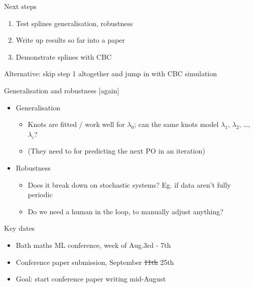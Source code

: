 \documentclass[presentation]{beamer}
\begin{document}
\begin{frame}[label={sec:org85e20cf}]{Next steps}
\begin{enumerate}
\item Test splines generalisation, robustness
\item Write up results so far into a paper
\item Demonstrate splines with CBC
\end{enumerate}

\vfill
Alternative: skip step 1 altogether and jump in with CBC simulation
\end{frame}

\begin{frame}[label={sec:org1e950a4}]{Generalisation and robustness [again]}
\begin{itemize}
\item Generalisation
\begin{itemize}
\item Knots are fitted / work well for \(\lambda_0\); can the same knots model \(\lambda_1\), \(\lambda_2\), \dots{}, \(\lambda_i\)?
\item (They need to for predicting the next PO in an iteration)
\end{itemize}
\end{itemize}
\vfill
\begin{itemize}
\item Robustness
\begin{itemize}
\item Does it break down on stochastic systems? Eg. if data aren't fully periodic
\item Do we need a human in the loop, to manually adjust anything?
\end{itemize}
\end{itemize}
\end{frame}

\begin{frame}[label={sec:org72cde9b}]{Key dates}
\begin{itemize}
\item Bath maths ML conference, week of Aug.3rd - 7th
\item Conference paper submission, September \sout{11th} 25th
\item Goal: start conference paper writing mid-August
\end{itemize}
\end{frame}
\end{document}
